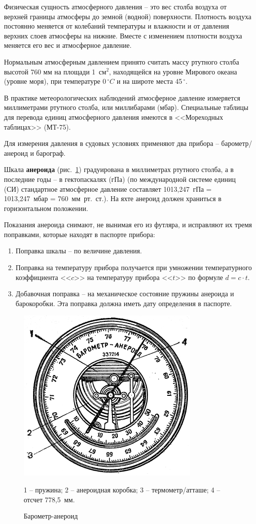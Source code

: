 \documentclass[a4paper, 12pt, twoside, final, book, russian, fittopage, cyremdash]{ncc}
\newcommand{\gr}{\ensuremath{\,^\circ}\xspace}
\newcommand{\grC}{\ensuremath{\,^{\circ}C}\xspace}
\newcommand{\ris}[1]{\ref{fig:#1}}
\begin{document}
Физическая сущность атмосферного давления \--- это вес столба воздуха от верхней границы атмосферы до земной (водной) поверхности. Плотность воздуха постоянно меняется от колебаний температуры и влажности и от давления верхних слоев атмосферы на нижние. Вместе с изменением плотности воздуха меняется его вес и атмосферное давление.

Нормальным атмосферным давлением принято считать массу ртутного столба высотой 760 мм на площади 1~см$^2$, находящейся на уровне Мирового океана (уровне моря), при температуре 0\grC и на широте места 45\gr.

В практике метеорологических наблюдений атмосферное давление измеряется миллиметрами ртутного столба, или миллибарами (мбар). Специальные таблицы для перевода единиц атмосферного давления имеются в <<Мореходных таблицах>> (МТ-75).

Для измерения давления в судовых условиях применяют два прибора \--- барометр\-/анероид и барограф.

Шкала \textbf{анероида} (рис.~\ris{109}) градуирована в миллиметрах ртутного столба, а в последние годы \--- в гектопаскалях (гПа) (по международной системе единиц (СИ) стандартное атмосферное давление составляет 1013,247~гПа = 1013,247~мбар = 760~мм~рт.~ст.). На яхте анероид должен храниться в горизонтальном положении.

Показания анероида снимают, не вынимая его из футляра, и исправляют их тремя поправками, которые находят в паспорте прибора:

\begin{enumerate}
\item Поправка шкалы \--- по величине давления. 
\item Поправка на температуру прибора получается при умножении температурного коэффициента <<$c$>> на температуру прибора <<$t$>> по формуле $d = c \cdot t$. 
\item Добавочная поправка \--- на механическое состояние пружины анероида и барокоробки. Эта поправка должна иметь дату определения в паспорте. 
\end{enumerate}

\begin{figure}[htb]
  \centering{}
  \includegraphics[scale=1.2]{0109P}
  \caption{Барометр-анероид}
  \label{fig:109}
  \small
  \centering{}
  1 \--- пружина; 2 \--- анероидная коробка; 3 \--- термометр\-/атташе; 4 \--- отсчет 778,5~мм. 
\end{figure}
\end{document}
